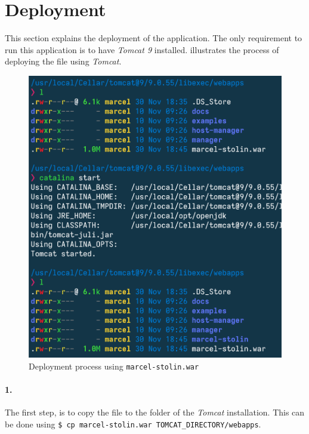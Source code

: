 \section{Deployment}\label{sec:03_depl}
This section explains the deployment of the application.
The only requirement to run this application is to have \textit{Tomcat 9} installed.
 illustrates the process of deploying the  file using \textit{Tomcat}.
\begin{figure}[h]
\centering
\includegraphics[scale=0.5]{images/03_depl/process}
\caption{Deployment process using \texttt{marcel-stolin.war}}
\label{fig:subsubsec:03_depl_process}
\end{figure}

\paragraph{1.}
The first step, is to copy the  file to the  folder of the \textit{Tomcat} installation.\newline
This can be done using \texttt{\$ cp marcel-stolin.war TOMCAT\_DIRECTORY/webapps}.

